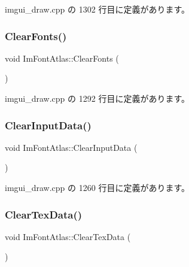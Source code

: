  imgui\+\_\+draw.\+cpp の 1302 行目に定義があります。

\mbox{\label{struct_im_font_atlas_ad5c2560d708bd0c389e9bd9da2d9b055}} 
\subsubsection{\texorpdfstring{Clear\+Fonts()}{ClearFonts()}}
{\footnotesize\ttfamily void Im\+Font\+Atlas\+::\+Clear\+Fonts (\begin{DoxyParamCaption}{ }\end{DoxyParamCaption})}



 imgui\+\_\+draw.\+cpp の 1292 行目に定義があります。

\mbox{\label{struct_im_font_atlas_a3f5bcbb7a2683b1af106fcf4e1217662}} 
\subsubsection{\texorpdfstring{Clear\+Input\+Data()}{ClearInputData()}}
{\footnotesize\ttfamily void Im\+Font\+Atlas\+::\+Clear\+Input\+Data (\begin{DoxyParamCaption}{ }\end{DoxyParamCaption})}



 imgui\+\_\+draw.\+cpp の 1260 行目に定義があります。

\mbox{\label{struct_im_font_atlas_a3ede4bd513bec044c77ac392ad9c6e86}} 
\subsubsection{\texorpdfstring{Clear\+Tex\+Data()}{ClearTexData()}}
{\footnotesize\ttfamily void Im\+Font\+Atlas\+::\+Clear\+Tex\+Data (\begin{DoxyParamCaption}{ }\end{DoxyParamCaption})}




